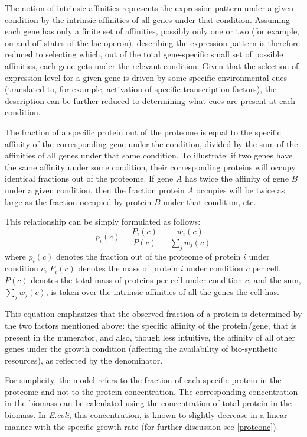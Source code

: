 \documentclass{article}
\begin{document}
The notion of intrinsic affinities represents the expression pattern under a given condition by the intrinsic affinities of all genes under that condition.
Assuming each gene has only a finite set of affinities, possibly only one or two (for example, on and off states of the lac operon), describing the expression pattern is therefore reduced to selecting which, out of the total gene-specific small set of possible affinities, each gene gets under the relevant condition.
Given that the selection of expression level for a given gene is driven by some specific environmental cues (translated to, for example, activation of specific transcription factors), the description can be further reduced to determining what cues are present at each condition.



The fraction of a specific protein out of the proteome is equal to the specific affinity of the corresponding gene under the condition, divided by the sum of the affinities of all genes under that same condition.
To illustrate: if two genes have the same affinity under some condition, their corresponding proteins will occupy identical fractions out of the proteome.
If gene $A$ has twice the affinity of gene $B$ under a given condition, then the fraction protein  $A$ occupies will be twice as large as the fraction occupied by protein $B$ under that condition, etc.

This relationship can be simply formulated as follows:
\begin{equation}
  \label{eq:concentration-ratio}
  p_i(c)=\frac{P_i(c)}{P(c)}=\frac{w_i(c)}{\sum_jw_j(c)}
\end{equation}
where $p_i(c)$ denotes the fraction out of the proteome of protein $i$ under condition $c$, $P_i(c)$ denotes the mass of protein $i$ under condition $c$ per cell, $P(c)$ denotes the total mass of proteins per cell under condition $c$, and the sum, $\sum_jw_j(c)$, is taken over the intrinsic affinities of all the genes the cell has.

This equation emphasizes that the observed fraction of a protein is determined by the two factors mentioned above: the specific affinity of the protein/gene, that is present in the numerator, and also, though less intuitive, the affinity of all other genes under the growth condition (affecting the availability of bio-synthetic resources), as reflected by the denominator.

For simplicity, the model refers to the fraction of each specific protein in the proteome and not to the protein concentration.
The corresponding concentration in the biomass can be calculated using the concentration of total protein in the biomass.
In \emph{E.coli}, this concentration, is known to slightly decrease in a linear manner with the specific growth rate \cite{Bremer1987,Valgepea2013,Scott2014} (for further discussion see \ref{protconc}).
\end{document}
